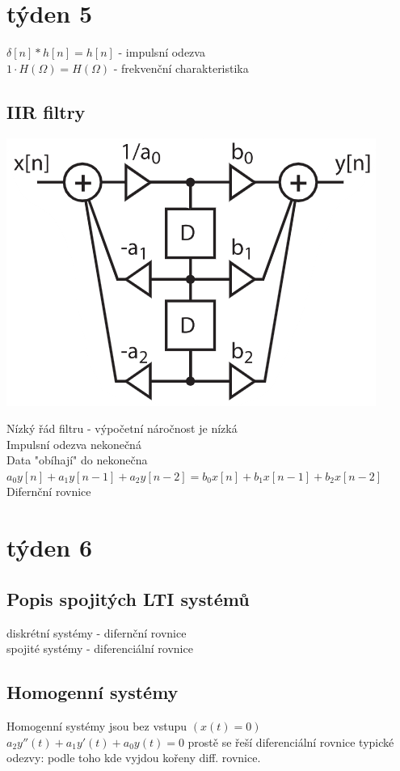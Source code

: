 \documentclass{article}
\begin{document}
	
		
\section*{týden 5}
$\delta[n] * h[n] =h[n]$ - impulsní odezva\\
$1\cdot H(\Omega)=H(\Omega)$ - frekvenční charakteristika

	\subsection*{IIR filtry}
	\begin{center}
		\includegraphics{IIR.png}
	\end{center}
	Nízký řád filtru - výpočetní náročnost je nízká\\
	Impulsní odezva nekonečná\\
	Data "obíhají" do nekonečna\\
	$a_0y[n]+a_1y[n-1]+a_2y[n-2]=b_0x[n]+b_1x[n-1]+b_2x[n-2] $ Difernční rovnice
\section*{týden 6}
	\subsection*{Popis spojitých LTI systémů}
		diskrétní systémy - difernční rovnice\\
		spojité systémy - diferenciální rovnice\\
		\subsection*{Homogenní systémy}
			Homogenní systémy jsou bez vstupu $(x(t)=0)$\\
			$a_2y''(t)+a_1y'(t)+a_0y(t)=0$ prostě se řeší diferenciální rovnice
			typické odezvy: podle toho kde vyjdou kořeny diff. rovnice.
\end{document}
